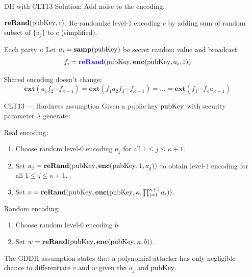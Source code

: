 \documentclass[english]{beamer}
\begin{document}
    \begin{frame}{DH with CLT13}
        Solution: Add noise to the encoding.

        $\mathbf{reRand}(\mathrm{pubKey}, c)$: Re-randomize level-1 encoding $c$ by adding sum of random subset of $\{z_j\}$ to $c$ (simplified).
        \pause

        Each party $i$: Let $a_i = \mathbf{samp}(\mathrm{pubKey})$ be secret random value and broadcast
        \begin{equation*}
            f_i = \textcolor{blue}{\mathbf{reRand}}(\mathrm{pubKey}, \mathbf{enc}(\mathrm{pubKey}, a_i, 1))
        \end{equation*}
        \pause

        Shared encoding doesn't change:
        \begin{equation*}
            \mathbf{ext}(a_1 f_2 \cdots f_{\kappa+1}) = \mathbf{ext}(f_1 a_2 f_3 \cdots f_{\kappa+1}) = \dots = \mathbf{ext}(f_1 \cdots f_{\kappa} a_{\kappa + 1})
        \end{equation*}
    \end{frame}
    \begin{frame}{CLT13 --- Hardness assumption}
        Given a public key $\mathrm{pubKey}$ with security parameter $\lambda$ generate:

        Real encoding:
        \begin{enumerate}
            \item Choose random level-0 encoding $a_j$ for all $1 \leq j \leq \kappa + 1$.
            \item Set $u_j = \mathbf{reRand}(\mathrm{pubKey}, \mathbf{enc}(\mathrm{pubKey}, 1, a_j))$ to obtain level-1 encoding for all $1 \leq j \leq \kappa + 1$.
            \item Set $v = \mathbf{reRand}(\mathrm{pubKey}, \mathbf{enc}(\mathrm{pubKey}, \kappa, \prod_{i=1}^{\kappa + 1} a_i))$.
        \end{enumerate}

        \pause
        Random encoding:
        \begin{enumerate}
            \item Choose random level-0 encoding $b$.
            \item Set $w = \mathbf{reRand}(\mathrm{pubKey}, \mathbf{enc}(\mathrm{pubKey}, \kappa, b))$.
        \end{enumerate}

        The GDDH assumption states that a polynomial attacker has only negligible chance to differentiate $v$ and $w$ given the $u_j$ and $\mathrm{pubKey}$.
    \end{frame}
\end{document}
